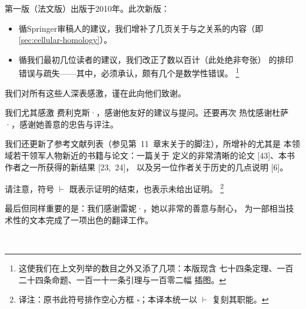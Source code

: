 第一版（法文版）出版于2010年。此次新版：
\begin{itemize}
  \item 循Springer审稿人的建议，我们增补了几页关于\trMorseHomology{}与\trCellularHomology{}之关系的内容（即\cref{sec:cellular-homology}）。
  \item 循我们最初几位读者的建议，我们改正了数以百计（此处绝非夸张）
        的排印错误与疏失——其中，必须承认，颇有几个是数学性错误。%
        \footnote{这使我们在上文列举的数目之外又添了几项：本版现含
        七十四条定理、一百二十四条命题、一百一十一条引理与一百零二幅
        插图。}
\end{itemize}

我们对所有这些人深表感激，谨在此向他们致谢。

我们尤其感激 费利克斯·\trSchlenk，感谢他友好的建议与提问。还要再次
热忱感谢杜萨·\trMcDuff，感谢她善意的忠告与评注。

我们还更新了参考文献列表（参见第~11~章末关于\trLagrange{}\trSubmanifold{}的脚注），所增补的尤其是
本领域若干领军人物新近的书籍与论文：一篇关于\trConleyZehnderIndex
{}定义的非常清晰的论文 [43]、本书作者之一所获得的新结果 [23,~24]，
以及另一位作者关于\trArnoldConjecture{}历史的几点说明 [6]。

请注意，符号 $\vdash$ 既表示证明的结束，也表示未给出证明。%
\footnote{译注：原书此符号排作空心方框 $\square$；本译本统一以
$\vdash$ 复刻其职能。}\noqed

最后但同样重要的是：我们感谢雷妮·\trErne，她以非常的善意与耐心，
为一部相当技术性的文本完成了一项出色的翻译工作。

\begin{flushright}
  \trAudinFull\\
  \trDamianFull
\end{flushright}
